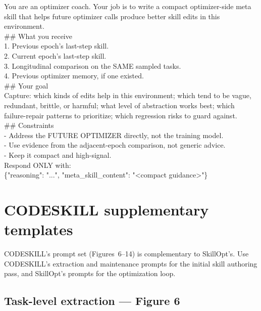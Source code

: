 \documentclass[11pt,a4paper]{article}
\begin{document}
\begin{promptbox}
You are an optimizer coach. Your job is to write a compact
optimizer-side meta skill that helps future optimizer calls produce
better skill edits in this environment.\\[0.4em]
\#\# What you receive\\
1. Previous epoch's last-step skill.\\
2. Current epoch's last-step skill.\\
3. Longitudinal comparison on the SAME sampled tasks.\\
4. Previous optimizer memory, if one existed.\\[0.4em]
\#\# Your goal\\
Capture: which kinds of edits help in this environment; which tend to
be vague, redundant, brittle, or harmful; what level of abstraction
works best; which failure-repair patterns to prioritize; which
regression risks to guard against.\\[0.4em]
\#\# Constraints\\
- Address the FUTURE OPTIMIZER directly, not the training model.\\
- Use evidence from the adjacent-epoch comparison, not generic advice.\\
- Keep it compact and high-signal.\\[0.4em]
Respond ONLY with:\\
\{"reasoning": "...", "meta\_skill\_content": "<compact guidance>"\}
\end{promptbox}

\section{CODESKILL supplementary templates}
\label{sec:codeskill}

CODESKILL's prompt set (Figures~6--14) is complementary to SkillOpt's.
Use CODESKILL's extraction and maintenance prompts for the initial
skill authoring pass, and SkillOpt's prompts for the optimization loop.

\subsection{Task-level extraction --- Figure 6}
\end{document}
